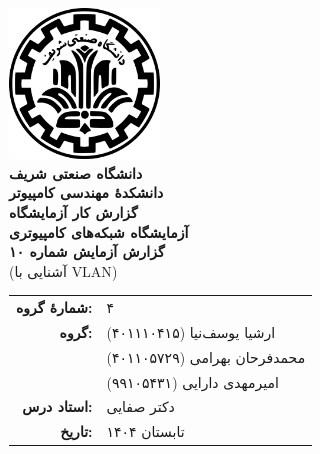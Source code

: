 \documentclass[12pt]{article}
\newcommand{\persianordinal}[1]{%
	\ifcase#1
	\or اول%
	\or دوم%
	\or سوم%
	\or چهارم%
	\or پنجم%
	\or ششم%
	\or هفتم%
	\or هشتم%
	\or نهم%
	\or دهم%
	\or یازدهم%
	\or دوازدهم%
	\or سیزدهم%
	\or چهاردهم%
	\or پانزدهم%
	\or شانزدهم%
	\or هفدهم%
	\or هجدهم%
	\or نوزدهم%
	\or بیستم%
	\else #1\fi
}
\newcommand{\persianordinalpage}{\persianfont\persianordinal{\value{page}}}
\begin{document}
	
	\begin{titlepage}
		\centering
		\vspace*{1cm}
		\includegraphics[width=4cm]{sharif.png}\\[1.5cm]
		{\Large\textbf{دانشگاه صنعتی شریف}}\\[0.5cm]
		{\large\textbf{دانشکدهٔ مهندسی کامپیوتر}}\\[1.5cm]
		{\Huge\textbf{گزارش کار آزمایشگاه}}\\[0.5cm]
		{\LARGE\textbf{آزمایشگاه شبکه‌های کامپیوتری}}\\[2cm]
		
		\textbf{گزارش آزمایش شماره ۱۰}\\
		(آشنایی با \textenglish{VLAN}‬‬)
		
		\vfill
		\begin{tabular}{rl}
			\textbf{شمارهٔ گروه:} & ۴ \\
			\textbf{گروه:} &
			ارشیا یوسف‌نیا (۴۰۱۱۱۰۴۱۵) \\
			& محمد‌فرحان بهرامی (۴۰۱۱۰۵۷۲۹) \\
			& امیرمهدی دارایی (۹۹۱۰۵۴۳۱) \\
			\textbf{استاد درس:} & دکتر صفایی \\
			\textbf{تاریخ:} & تابستان ۱۴۰۴ \\
		\end{tabular}
	\end{titlepage}
	
	\clearpage
	\setcounter{page}{1}
	\renewcommand{\thepage}{\persianordinalpage}
	
	\tableofcontents
	\clearpage
	\listoffigures
	
	\clearpage
	\setcounter{page}{1}
	\renewcommand{\thepage}{\persianfont\arabic{page}}
	
	
\end{document}
